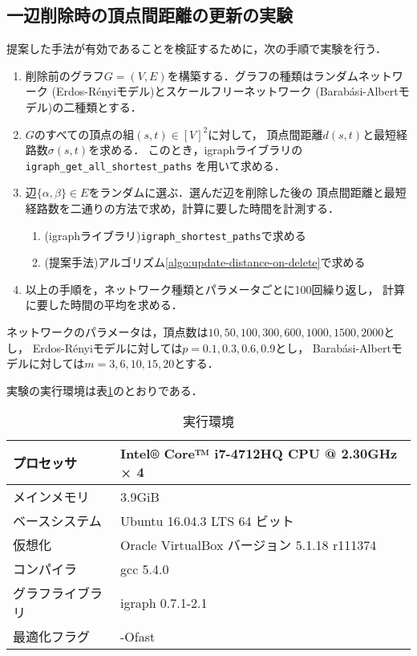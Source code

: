 \subsection*{一辺削除時の頂点間距離の更新の実験}
提案した手法が有効であることを検証するために，次の手順で実験を行う．
\begin{enumerate}
\item 削除前のグラフ$G=(V,E)$を構築する．グラフの種類はランダムネットワーク
  (Erdos-R{\'e}nyiモデル\cite{Erdos1959})とスケールフリーネットワーク
  (Barab{\'a}si-Albertモデル\cite{Barabasi1999})の二種類とする．
\item $G$のすべての頂点の組$(s,t)\in[V]^2$に対して，
  頂点間距離$d(s,t)$と最短経路数$\sigma(s,t)$を求める．
  このとき，igraphライブラリの\verb|igraph_get_all_shortest_paths|
  を用いて求める．
\item 辺$\{\alpha,\beta\}\in E$をランダムに選ぶ．選んだ辺を削除した後の
  頂点間距離と最短経路数を二通りの方法で求め，計算に要した時間を計測する．
  \begin{enumerate}[a]
  \item (igraphライブラリ)\verb|igraph_shortest_paths|で求める
  \item (提案手法)アルゴリズム\ref{algo:update-distance-on-delete}で求める
  \end{enumerate}
\item 以上の手順を，ネットワーク種類とパラメータごとに100回繰り返し，
  計算に要した時間の平均を求める．
\end{enumerate}
ネットワークのパラメータは，頂点数は$10,50,100,300,600,1000,1500,2000$とし，
Erdos-R{\'e}nyiモデルに対しては$p=0.1,0.3,0.6,0.9$とし，
Barab{\'a}si-Albertモデルに対しては$m=3,6,10,15,20$とする．

実験の実行環境は表\ref{tab:env-mws}のとおりである．
\begin{table}
  \caption{実行環境}
  \label{tab:env-mws}
  \centering
  \begin{tabular}{ll}
    \hline
    プロセッサ & Intel® Core™ i7-4712HQ CPU @ 2.30GHz × 4 \\ \hline
    メインメモリ & 3.9GiB \\ \hline
    ベースシステム & Ubuntu 16.04.3 LTS 64 ビット \\ \hline
    仮想化 & Oracle VirtualBox バージョン 5.1.18 r111374 \\ \hline
    コンパイラ & gcc 5.4.0 \\ \hline
    グラフライブラリ & igraph 0.7.1-2.1 \\ \hline
    最適化フラグ & -Ofast \\ \hline
  \end{tabular}
\end{table}

